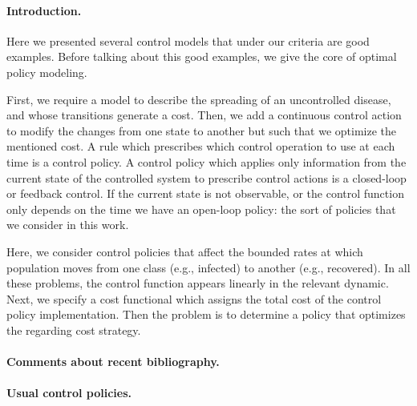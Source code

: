 
\paragraph{Introduction.} 
Here we presented several control models that under our criteria are good 
examples. Before talking about this good examples, we give the core of optimal 
policy modeling.

First, we require a model to describe the spreading of an uncontrolled disease,
and whose transitions generate a cost. Then, we add a continuous control action
to modify the changes from one state to another but such that we optimize the
mentioned cost. A rule which prescribes which control operation to use at each
time is a control policy. A control policy which applies only information from
the current state of the controlled system to prescribe control actions is a
closed-loop or feedback control. If the current state is not observable, or the
control function only depends on the time we have an open-loop policy: the sort
of policies that we consider in this work.

Here, we consider control policies that affect the bounded rates at which
population moves from one class (e.g., infected) to another (e.g., recovered).
In all these problems, the control function appears linearly in the relevant
dynamic. Next, we specify a cost functional which assigns the total cost of the
control policy implementation. Then the problem is to determine a policy that
optimizes the regarding cost strategy.

\paragraph{Comments about recent bibliography.}

\paragraph{Usual control policies.}
